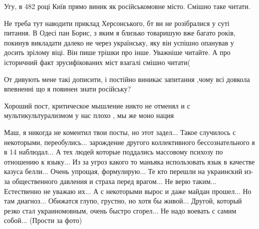 \begin{itemize}
 
Угу, в 482 році Київ прямо виник як російськомовне місто. Смішно таке читати.

 

Не треба тут наводити приклад Херсонського, бт ви не розібралися у суті
питання. В Одесі пан Борис, з яким я близько товаришую вже багато років,
покинув викладати далеко не через українську, яку він успішно опанував у досить
зрілому віці. Він пише трішки про інше. Уважніше читайте. А про історичний факт
зрусифікованих міст взагалі смішно читати(


 

От дивують мене такі дописити, і постійно виникає запитання ,чому всі довкола впевненні що я повинен знати російську?


 

Хороший пост, критическое мышление никто не отменял и с мультикультурализмом у
нас плохо , мы же моно нация

\par
 

\obeycr
Маш, я никогда не коментил твои посты, но этот задел...
Такое случилось с некоторыми, переобулись...
зарождение другого коллективного бессознательного я в 14 наблюдал...
А тех людей которые поддались массовому психозу по отношению к языку... Из за угроз какого то маньяка использовать язык в качестве казуса белли... Очень упрощая, формулирую...
Те кто перешли на украинский из-за общественного давления и страха перед врагом...
Не верю таким...
Естественно не уважаю их...
А с некоторыми вырос и даже майдан прошел...
Но там диагноз... Обижатся глупо, грустно, но хотя бы живой...
Другой, который резко стал украиномовным, очень быстро сгорел...
Не надо воевать с самим собой...
(Прости за фото)
\restorecr


\end{itemize}

